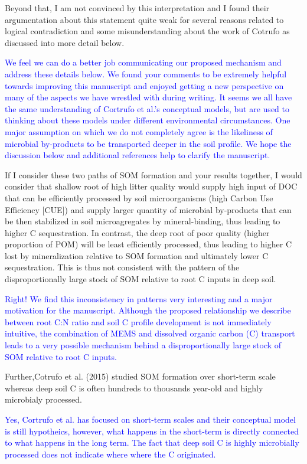 \documentclass[]{article}
\begin{document}
Beyond that, I am not convinced by this interpretation and I found their
argumentation about this statement quite weak for several reasons
related to logical contradiction and some misunderstanding about the
work of Cotrufo as discussed into more detail below.

\textcolor{blue}{We feel we can do a better job communicating our proposed mechanism and address these details below. We found your comments to be extremely helpful towards improving this manuscript and enjoyed getting a new perspective on many of the aspects we have wrestled with during writing. It seems we all have the same understanding of Cortrufo et al.'s conceptual models, but are used to thinking about these models under different environmental circumstances. One major assumption on which we do not completely agree is the likeliness of microbial by-products to be transported deeper in the soil profile. We hope the discussion below and additional references help to clarify the manuscript.}

If I consider these two paths of SOM formation and your results
together, I would consider that shallow root of high litter quality
would supply high input of DOC that can be efficiently processed by soil
microorganisms (high Carbon Use Efficiency {[}CUE{]}) and supply larger
quantity of microbial by-products that can be then stabilized in soil
microagregates by mineral-binding, thus leading to higher C
sequestration. In contrast, the deep root of poor quality (higher
proportion of POM) will be least efficiently processed, thus leading to
higher C lost by mineralization relative to SOM formation and ultimately
lower C sequestration. This is thus not consistent with the pattern of
the disproportionally large stock of SOM relative to root C inputs in
deep soil.

\textcolor{blue}{Right! We find this inconsistency in patterns very interesting and a major motivation for the manuscript. Although the proposed relationship we describe between root C:N ratio and soil C profile development is not immediately intuitive, the combination of MEMS and dissolved organic carbon (C) transport leads to a very possible mechanism behind a disproportionally large stock of SOM relative to root C inputs.}

Further,Cotrufo et al. (2015) studied SOM formation over short-term
scale whereas deep soil C is often hundreds to thousands year-old and
highly microbialy processed.

\textcolor{blue}{Yes, Cortrufo et al. has focused on short-term scales and their conceptual model is still hypotheics, however, what happens in the short-term is directly connected to what happens in the long term. The fact that deep soil C is highly microbially processed does not indicate where where the C originated.}
\end{document}
